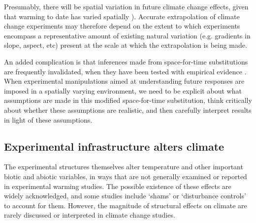 \documentclass{article}
\begin{document}
\par Presumably, there will be spatial variation in future climate change effects, given that warming to date has varied spatially \citep{ipcc2013}).  Accurate extrapolation of climate change experiments may therefore depend on the extent to which experiments encompass a representative amount of existing natural variation (e.g. gradients in slope, aspect, etc) present at the scale at which the extrapolation is being made. 
\par An added complication is that inferences made from space-for-time substitutions are frequently invalidated, when they have been tested with empirical evidence \citep{johnson2008,jochner2013}. When experimental manipulations aimed at understanding future responses are imposed in a spatially varying environment, we need to be explicit about what assumptions are made in this modified space-for-time substitution, think critically about whether these assumptions are realistic, and then carefully interpret results in light of these assumptions. %
\subsection* {Experimental infrastructure alters climate}
The experimental structures themselves alter temperature and other important biotic and abiotic variables, in ways that are not generally examined or reported in experimental warming studies. The possible existence of these effects are widely acknowledged, and some studies include `shams' or `disturbance controls' to account for them. However, the magnitude of structural effects on climate are rarely discussed or interpreted in climate change studies.
\end{document}
